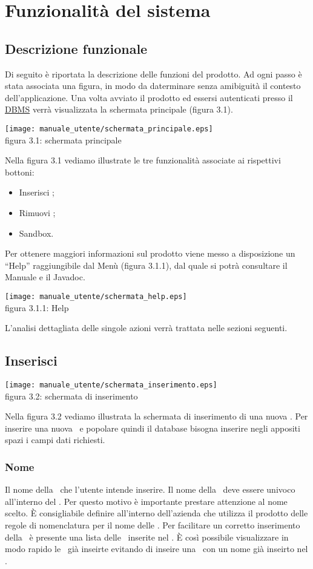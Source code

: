 \chapter{Funzionalit\`a del sistema}
\section{Descrizione funzionale}
Di seguito \`e riportata la descrizione delle funzioni del prodotto. Ad ogni passo \`e stata associata una figura, in modo da daterminare senza amibiguit\`a il contesto dell'applicazione. Una volta avviato il prodotto ed essersi autenticati presso il \underline{DBMS} verr\`a visualizzata la schermata principale (figura 3.1).
\begin{center}
\texttt{[image: manuale\_utente/schermata\_principale.eps]}\\
 figura 3.1: schermata principale
\end{center}
Nella figura 3.1 vediamo illustrate le tre funzionalit\`a associate ai rispettivi bottoni:
\begin{itemize}
\item Inserisci \br;
\item Rimuovi \br;
\item Sandbox.
\end{itemize}
Per ottenere maggiori informazioni sul prodotto viene messo a disposizione un ``Help'' raggiungibile dal Men\`u (figura 3.1.1), dal quale si potr\`a consultare il Manuale e il Javadoc.
\begin{center}
\texttt{[image: manuale\_utente/schermata\_help.eps]}\\
 figura 3.1.1: Help
\end{center}

L'analisi dettagliata delle singole azioni verr\`a trattata nelle sezioni seguenti.
\section{Inserisci \br}
\begin{center}
\texttt{[image: manuale\_utente/schermata\_inserimento.eps]}\\
 figura 3.2: schermata di inserimento
\end{center}
Nella figura 3.2 vediamo illustrata la schermata di inserimento di una nuova \br. Per inserire una nuova \br\ e popolare quindi il database bisogna inserire negli appositi spazi i campi dati richiesti.
\subsection{Nome}
Il nome della \br\ che l'utente intende inserire. Il nome della \br\ deve essere univoco all'interno del \rp. Per questo motivo \`e importante prestare attenzione al nome scelto. \`E consigliabile definire all'interno dell'azienda che utilizza il prodotto delle regole di nomenclatura per il nome delle \br. Per facilitare un corretto inserimento della \br\ \`e presente una lista delle \br\ inserite nel \rp. \`E cos\`i possibile visualizzare in modo rapido le \br\ gi\`a inseirte evitando di inseire una \br\ con un nome gi\`a inseirto nel \rp.


